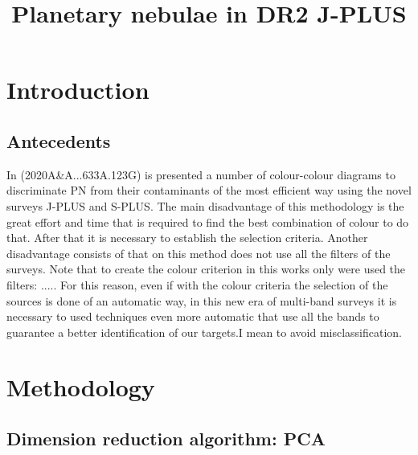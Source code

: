 \documentclass[11pt]{article}
\title{Planetary nebulae in DR2 J-PLUS }
\date{}
\begin{document}
\maketitle


\section{Introduction}
\label{sec:into}

\subsection{Antecedents}
\label{sec:antec}

In (2020A\&A...633A.123G) is presented a number of colour-colour diagrams to discriminate PN from their contaminants of the most efficient way using the novel surveys J-PLUS and S-PLUS. The main disadvantage of this methodology is the great effort and time that is required to find the best combination of colour to do that. After that it is necessary to establish the selection criteria. Another disadvantage consists of that on this method does not use all the filters of the surveys. Note that to create the colour criterion in this works only were used the filters: ..... For this reason, even if with the colour criteria the selection of the sources is done of an automatic way, in this new era of multi-band surveys it is necessary to used techniques even more automatic that use all the bands to guarantee a better identification of our targets.I mean to avoid misclassification.        
 
\section{Methodology}
\label{sec:into}

\subsection{Dimension reduction algorithm: PCA}
\label{sec:pca-lda}
\end{document}

